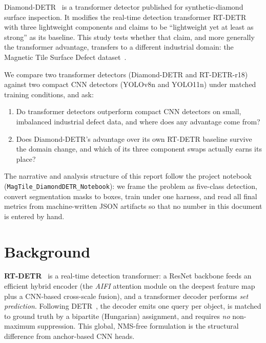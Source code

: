 \documentclass[11pt,a4paper]{article}
\begin{document}
Diamond-DETR~\cite{diamond} is a transformer detector published for synthetic-diamond surface
inspection. It modifies the real-time detection transformer RT-DETR~\cite{rtdetr} with three
lightweight components and claims to be ``lightweight yet at least as strong'' as its baseline.
This study tests whether that claim, and more generally the transformer advantage, transfers to a
different industrial domain: the Magnetic Tile Surface Defect dataset~\cite{magtile}.

We compare two transformer detectors (Diamond-DETR and RT-DETR-r18) against two compact CNN
detectors (YOLOv8n and YOLO11n) under matched training conditions, and ask:

\begin{enumerate}[leftmargin=1.4em,itemsep=2pt,topsep=2pt]
  \item Do transformer detectors outperform compact CNN detectors on small, imbalanced industrial
        defect data, and where does any advantage come from?
  \item Does Diamond-DETR's advantage over its own RT-DETR baseline survive the domain change, and
        which of its three component swaps actually earns its place?
\end{enumerate}

The narrative and analysis structure of this report follow the project notebook
(\texttt{MagTile\_DiamondDETR\_Notebook}): we frame the problem as five-class detection, convert
segmentation masks to boxes, train under one harness, and read all final metrics from
machine-written JSON artifacts so that no number in this document is entered by hand.

\section{Background}
\textbf{RT-DETR}~\cite{rtdetr} is a real-time detection transformer: a ResNet backbone feeds an
efficient hybrid encoder (the \emph{AIFI} attention module on the deepest feature map plus a
CNN-based cross-scale fusion), and a transformer decoder performs \emph{set prediction}. Following
DETR~\cite{detr}, the decoder emits one query per object, is matched to ground truth by a
bipartite (Hungarian) assignment, and requires \emph{no} non-maximum suppression. This global,
NMS-free formulation is the structural difference from anchor-based CNN heads.
\end{document}
